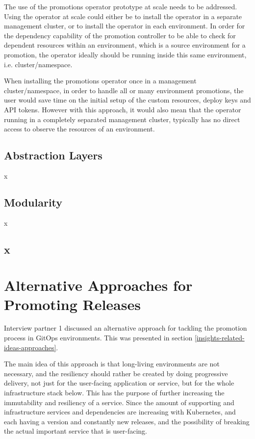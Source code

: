 The use of the promotions operator prototype at scale needs to be addressed.
Using the operator at scale could either be to install the operator in a separate management cluster,
or to install the operator in each environment.
In order for the dependency capability of the promotion controller
to be able to check for dependent resources within an environment,
which is a source environment for a promotion,
the operator ideally should be running inside this same environment, i.e. cluster/namespace.

When installing the promotions operator once in a management cluster/namespace,
in order to handle all or many environment promotions,
the user would save time on the initial setup of the custom resources, deploy keys and API tokens.
However with this approach, it would also mean that the operator running in a completely separated management cluster, typically has no direct access to observe the resources of an environment.

\subsection*{Abstraction Layers}

x

\subsection*{Modularity}

x

\subsection*{x}













\section*{Alternative Approaches for Promoting Releases}

Interview partner 1 discussed an alternative approach for tackling the promotion process in GitOps environments.
This was presented in section \ref{insights-related-ideas-approaches}.

The main idea of this approach is that long-living environments are not necessary,
and the resiliency should rather be created by doing progressive delivery,
not just for the user-facing application or service,
but for the whole infrastructure stack below.
This has the purpose of further increasing the immutability and resiliency of a service.
Since the amount of supporting and infrastructure services and dependencies are increasing with Kubernetes,
and each having a version and constantly new releases, and the possibility of breaking the actual important
service that is user-facing.

